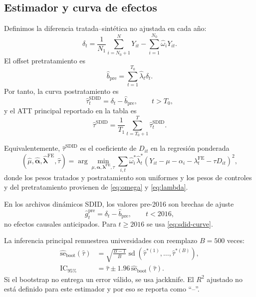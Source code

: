 \documentclass[11pt]{article}
\newcommand{\SDID}{\mathrm{SDID}}
\newcommand{\FE}{\mathrm{FE}}
\begin{document}
\subsection{Estimador y curva de efectos}

Definimos la diferencia tratada--sintética no ajustada en cada año:
\begin{equation}
 \delta_t=
 \frac{1}{N_1}\sum_{i=N_0+1}^{N}Y_{it}
 -\sum_{i=1}^{N_0}\widehat\omega_iY_{it}.
\end{equation}
El offset pretratamiento es
\begin{equation}
 \widehat b_{\mathrm{pre}}
 =\sum_{t=1}^{T_0}\widehat\lambda_t\delta_t.
\end{equation}
Por tanto, la curva postratamiento es
\begin{equation}
 \widehat\tau_t^{\SDID}=\delta_t-\widehat b_{\mathrm{pre}},
 \qquad t>T_0,
 \label{eq:sdid-curve}
\end{equation}
y el ATT principal reportado en la tabla es
\begin{equation}
 \widehat\tau^{\SDID}
 =\frac{1}{T_1}\sum_{t=T_0+1}^{T}
   \widehat\tau_t^{\SDID}.
 \label{eq:sdid-att}
\end{equation}

Equivalentemente, $\widehat\tau^{\SDID}$ es el coeficiente de $D_{it}$ en la
regresión ponderada
\begin{equation}
 (\widehat\mu,\widehat{\boldsymbol\alpha},
  \widehat{\boldsymbol\lambda}^{\FE},\widehat\tau)
 =\arg\min_{\mu,\boldsymbol\alpha,\boldsymbol\lambda^{\FE},\tau}
 \sum_{i,t}\widehat\omega_i^{*}\widehat\lambda_t^{*}
 \left(Y_{it}-\mu-\alpha_i-\lambda_t^{\FE}-\tau D_{it}\right)^2,
\end{equation}
donde los pesos tratados y postratamiento son uniformes y los pesos de controles
y del pretratamiento provienen de \eqref{eq:omega} y \eqref{eq:lambda}.

En los archivos dinámicos SDID, los valores pre-2016 son brechas de ajuste
\begin{equation}
 \widehat g_t^{\mathrm{pre}}=\delta_t-\widehat b_{\mathrm{pre}},
 \qquad t<2016,
\end{equation}
no efectos causales anticipados. Para $t\geq2016$ se usa
\eqref{eq:sdid-curve}.

La inferencia principal remuestrea universidades con reemplazo $B=500$ veces:
\begin{align}
 \widehat{\mathrm{se}}_{\mathrm{boot}}(\widehat\tau)
 &=\sqrt{\frac{B-1}{B}}
   \operatorname{sd}\!\left(
    \widehat\tau^{*(1)},\ldots,\widehat\tau^{*(B)}
   \right), \\
 \mathrm{IC}_{95\%}
 &=\widehat\tau\pm 1.96\,
   \widehat{\mathrm{se}}_{\mathrm{boot}}(\widehat\tau).
\end{align}
Si el bootstrap no entrega un error válido, se usa jackknife. El $R^2$ ajustado
no está definido para este estimador y por eso se reporta como ``--''.
\end{document}
